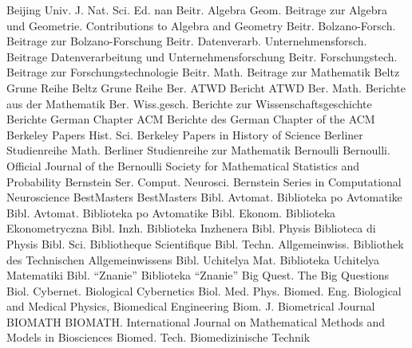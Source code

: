 {Beijing Univ. J. Nat. Sci. Ed.}
{nan}
{Beitr. Algebra Geom.}
{Beitrage zur Algebra und Geometrie. Contributions to Algebra and Geometry}
{Beitr. Bolzano-Forsch.}
{Beitrage zur Bolzano-Forschung}
{Beitr. Datenverarb. Unternehmensforsch.}
{Beitrage Datenverarbeitung und Unternehmensforschung}
{Beitr. Forschungstech.}
{Beitrage zur Forschungstechnologie}
{Beitr. Math.}
{Beitrage zur Mathematik}
{Beltz Grune Reihe}
{Beltz Grune Reihe}
{Ber. ATWD}
{Bericht ATWD}
{Ber. Math.}
{Berichte aus der Mathematik}
{Ber. Wiss.gesch.}
{Berichte zur Wissenschaftsgeschichte}
{Berichte German Chapter ACM}
{Berichte des German Chapter of the ACM}
{Berkeley Papers Hist. Sci.}
{Berkeley Papers in History of Science}
{Berliner Studienreihe Math.}
{Berliner Studienreihe zur Mathematik}
{Bernoulli}
{Bernoulli. Official Journal of the Bernoulli Society for Mathematical Statistics and Probability}
{Bernstein Ser. Comput. Neurosci.}
{Bernstein Series in Computational Neuroscience}
{BestMasters}
{BestMasters}
{Bibl. Avtomat.}
{Biblioteka po Avtomatike}
{Bibl. Avtomat.}
{Biblioteka po Avtomatike}
{Bibl. Ekonom.}
{Biblioteka Ekonometryczna}
{Bibl. Inzh.}
{Biblioteka Inzhenera}
{Bibl. Physis}
{Biblioteca di Physis}
{Bibl. Sci.}
{Bibliotheque Scientifique}
{Bibl. Techn. Allgemeinwiss.}
{Bibliothek des Technischen Allgemeinwissens}
{Bibl. Uchitelya Mat.}
{Biblioteka Uchitelya Matematiki}
{Bibl. ``Znanie''}
{Biblioteka ``Znanie''}
{Big Quest.}
{The Big Questions}
{Biol. Cybernet.}
{Biological Cybernetics}
{Biol. Med. Phys. Biomed. Eng.}
{Biological and Medical Physics, Biomedical Engineering}
{Biom. J.}
{Biometrical Journal}
{BIOMATH}
{BIOMATH. International Journal on Mathematical Methods and Models in Biosciences}
{Biomed. Tech.}
{Biomedizinische Technik}
